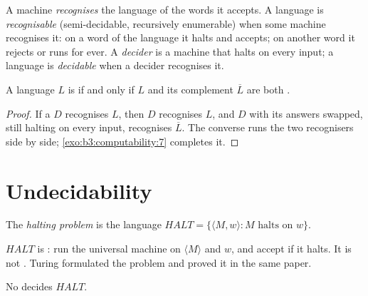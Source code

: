 \begin{definition}\label{def:b3:computability:languages}
A machine \emph{recognises} the language of the words it accepts. A language is \emph{recognisable} (semi-decidable, recursively enumerable) when some machine recognises it: on a word of the language it halts and accepts; on another word it rejects or runs for ever. A \emph{decider} is a machine that halts on every input; a language is \emph{decidable} when a decider recognises it.
\end{definition}

\begin{theorem}\label{thm:b3:computability:complement}
A language $L$ is  if and only if $L$ and its complement $\overline{L}$ are both .
\end{theorem}

\begin{proof}
If a  $D$ recognises $L$, then $D$ recognises $L$, and $D$ with its answers swapped, still halting on every input, recognises $\overline{L}$. The converse runs the two recognisers side by side; \cref{exo:b3:computability:7} completes it.
\end{proof}

\section{Undecidability}\label{sec:b3:computability:undecidable}

\begin{definition}\label{def:b3:computability:halting}
The \emph{halting problem} is the language $\mathit{HALT} = \{ \langle M, w \rangle : M \text{ halts on } w \}$.
\end{definition}

$\mathit{HALT}$ is : run the universal machine on $\langle M \rangle$ and $w$, and accept if it halts. It is not . Turing formulated the problem and proved it in the same paper. %

\begin{theorem}\label{thm:b3:computability:halting}
No  decides $\mathit{HALT}$.
\end{theorem}

